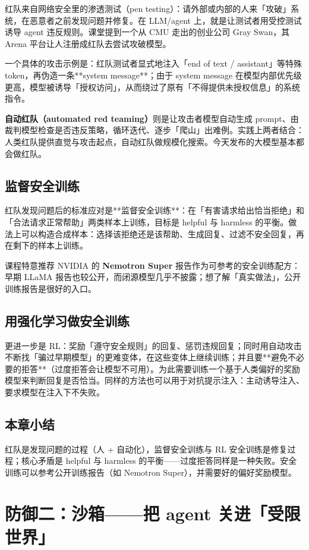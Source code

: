 ﻿\documentclass[a4paper]{article}
\begin{document}
红队来自网络安全里的渗透测试（pen testing）：请外部或内部的人来「攻破」系统，在恶意者之前发现问题并修复。在 LLM/agent 上，就是让测试者用受控测试诱导 agent 违反规则。课堂提到一个从 CMU 走出的创业公司 Gray Swan，其 Arena 平台让人注册成红队去尝试攻破模型。

一个具体的攻击示例是：红队测试者显式地注入「end of text / assistant」等特殊 token，再伪造一条**system message**；由于 system message 在模型内部优先级更高，模型被诱导「授权访问」，从而绕过了原有「不得提供未授权信息」的系统指令。

\textbf{自动红队（automated red teaming）}则是让攻击者模型自动生成 prompt、由裁判模型检查是否违反策略，循环迭代、逐步「爬山」出难例。实践上两者结合：人类红队提供直觉与攻击起点，自动红队做规模化搜索。今天发布的大模型基本都会做红队。

\subsection{监督安全训练}

红队发现问题后的标准应对是**监督安全训练**：在「有害请求给出恰当拒绝」和「合法请求正常帮助」两类样本上训练，目标是 helpful 与 harmless 的平衡。做法上可以构造合成样本：选择该拒绝还是该帮助、生成回复、过滤不安全回复，再在剩下的样本上训练。

课程特意推荐 NVIDIA 的 \textbf{Nemotron Super} 报告作为可参考的安全训练配方：早期 LLaMA 报告也较公开，而闭源模型几乎不披露；想了解「真实做法」，公开训练报告是很好的入口。

\subsection{用强化学习做安全训练}

更进一步是 RL：奖励「遵守安全规则」的回复、惩罚违规回复；同时用自动攻击不断找「骗过早期模型」的更难变体，在这些变体上继续训练；并且要**避免不必要的拒答**（过度拒答会让模型不可用）。为此需要训练一个基于人类偏好的奖励模型来判断回复是否恰当。同样的方法也可以用于对抗提示注入：主动诱导注入、要求模型在注入下不失败。

\subsection{本章小结}
红队是发现问题的过程（人 + 自动化），监督安全训练与 RL 安全训练是修复过程；核心矛盾是 helpful 与 harmless 的平衡——过度拒答同样是一种失败。安全训练可以参考公开训练报告（如 Nemotron Super），并需要好的偏好奖励模型。

\section{防御二：沙箱——把 agent 关进「受限世界」}
\end{document}
